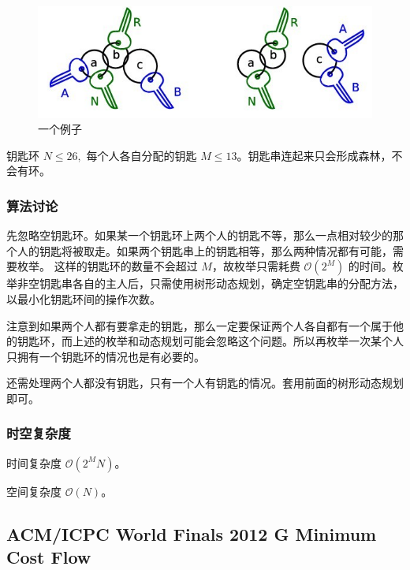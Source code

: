				\begin{figure}[!htb]
 					\centering
					\includegraphics[width=0.8 \textwidth]{2.jpg}
					\caption{一个例子}
				\end{figure}
					
				钥匙环 $N \le 26, $ 每个人各自分配的钥匙 $ M\le 13$。钥匙串连起来只会形成森林，不会有环。


			\subsubsection{算法讨论}
				先忽略空钥匙环。如果某一个钥匙环上两个人的钥匙不等，那么一点相对较少的那个人的钥匙将被取走。如果两个钥匙串上的钥匙相等，那么两种情况都有可能，需要枚举。 这样的钥匙环的数量不会超过 $M$，故枚举只需耗费 $\mathcal{O}\left(2^M\right)$ 的时间。枚举非空钥匙串各自的主人后，只需使用树形动态规划，确定空钥匙串的分配方法，以最小化钥匙环间的操作次数。
				
				注意到如果两个人都有要拿走的钥匙，那么一定要保证两个人各自都有一个属于他的钥匙环，而上述的枚举和动态规划可能会忽略这个问题。所以再枚举一次某个人只拥有一个钥匙环的情况也是有必要的。
				
				还需处理两个人都没有钥匙，只有一个人有钥匙的情况。套用前面的树形动态规划即可。
			\subsubsection{时空复杂度}
				时间复杂度 $\mathcal{O}\left(2^M N\right)$。
					
				空间复杂度 $\mathcal{O}\left(N\right)$。
		\newpage
		\subsection{ACM/ICPC World Finals 2012 G Minimum Cost Flow}
